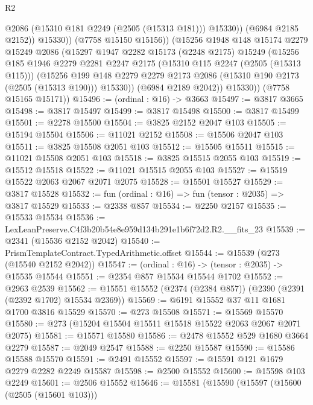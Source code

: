 \begin{lexlean}{R2}
\begin{coremodule}
                    @2086
                    (@15310 @181 @2249 (@2505 (@15313 @181)))
                    @15330))
                (@6984 @2185 @2152))
              @15330))
          (@7758 @15150 @15156))
        (@15256
          @1948
          @148
          @15174
          @2279
          @15249
          @2086
          (@15297
            @1947
            @2282
            @15173
            (@2248 @2175)
            @15249
            (@15256
              @185
              @1946
              @2279
              @2281
              @2247
              @2175
              (@15310 @115 @2247 (@2505 (@15313 @115)))
              (@15256
                @199
                @148
                @2279
                @2279
                @2173
                @2086
                (@15310 @190 @2173 (@2505 (@15313 @190)))
                @15330))
            (@6984 @2189 @2042))
          @15330))
      (@7758 @15165 @15171))
@15496 := (ordinal : @16) -> @3663
@15497 := @3817 @3665
@15498 := @3817 @15497
@15499 := @3817 @15498
@15500 := @3817 @15499
@15501 := @2278 @15500
@15504 := @3825 @2152 @2047 @103
@15505 := @15194 @15504
@15506 := @11021 @2152
@15508 := @15506 @2047 @103
@15511 := @3825 @15508 @2051 @103
@15512 := @15505 @15511
@15515 := @11021 @15508 @2051 @103
@15518 := @3825 @15515 @2055 @103
@15519 := @15512 @15518
@15522 := @11021 @15515 @2055 @103
@15527 := @15519 @15522 @2063 @2067 @2071 @2075
@15528 := @15501 @15527
@15529 := @3817 @15528
@15532 := fun (ordinal : @16) => fun (tensor : @2035) => @3817 @15529
@15533 := @2338 @857
@15534 := @2250 @2157
@15535 := @15533 @15534
@15536 := LexLeanPreserve.C4f3b20b54e8e959d134b291e1b6f72d2.R2.__fits_23
@15539 := @2341 (@15536 @2152 @2042)
@15540 := PrismTemplateContract.TypedArithmetic.offset
@15544 := @15539 (@273 (@15540 @2152 @2042))
@15547 := (ordinal : @16) -> (tensor : @2035) -> @15535 @15544
@15551 := @2354 @857 @15534 @15544 @1702
@15552 := @2963 @2539
@15562 := @15551 @15552 (@2374 (@2384 @857)) (@2390 (@2391 (@2392 @1702) @15534 @2369))
@15569 := @6191 @15552 @37 @11 @1681 @1700 @3816 @15529
@15570 := @273 @15508
@15571 := @15569 @15570
@15580 := @273 (@15204 @15504 @15511 @15518 @15522 @2063 @2067 @2071 @2075)
@15581 := @15571 @15580
@15586 := @2478 @15552 @529 @1680 @3664 @2279
@15587 := @2049 @2547
@15588 := @2250 @15587
@15590 := @15586 @15588 @15570
@15591 := @2491 @15552
@15597 := @15591 @121 @1679 @2279 @2282 @2249 @15587
@15598 := @2500 @15552
@15600 := @15598 @103 @2249
@15601 := @2506 @15552
@15646 := @15581
    (@15590
      (@15597
        (@15600 (@2505 (@15601 @103)))

\end{coremodule}
\end{lexlean}
